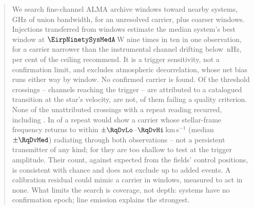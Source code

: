 \begin{abstract}
We search \NWinA{} fine-channel ALMA archive windows toward \NSysClassA{}
nearby systems, \CvUnionA\,GHz of union bandwidth, for an unresolved
carrier, plus \NWinB{} coarser windows.
Injections transferred from \NInjWinA{} windows estimate the median system's
best window at $\EirpNinetySysMedA$\,W nine times in ten in one observation,
for a carrier narrower than the instrumental channel drifting
below \DriftCeilLo\,nHz, \AccelSheikhPct{} per cent of the ceiling
\citet{Sheikh2019} recommend. It is a trigger sensitivity, not a confirmation
limit, and excludes atmospheric decorrelation, whose net bias runs either way
by window.
No confirmed carrier is found. Of the \EvNCrossRaw{} threshold crossings --
channels reaching the trigger -- \MkAttr{} are attributed to a catalogued
transition at the star's velocity, \MkUnattr{} are not, \PrFlagXrossWord{} of
them failing a quality criterion.
None of the \RcNExclPoss{} unattributed crossings with a repeat reading
recurred, including \PrRankClause.
In \HjNPowerHi{} of \RcNExcl{} a repeat would show a carrier whose
stellar-frame frequency returns to within $\pm\RqDvLo$--$\RqDvHi$\,km\,s$^{-1}$
(median $\pm\RqDvMed$) radiating through both observations -- not a persistent
transmitter of any kind; for \HjNPowerLo{} they are too shallow to test at the
trigger amplitude.
Their count, \CeObs{} against \CeExp{} expected from the fields' control
positions, is consistent with chance and does not exclude up to \CeAddLim{}
added events. A calibration residual could mimic a carrier in \CxNAdmit{}
windows, measured to act in none.
What limits the search is coverage, not depth: \ZcNoRepSys{} systems have no
confirmation epoch; line emission explains the strongest.
\end{abstract}


